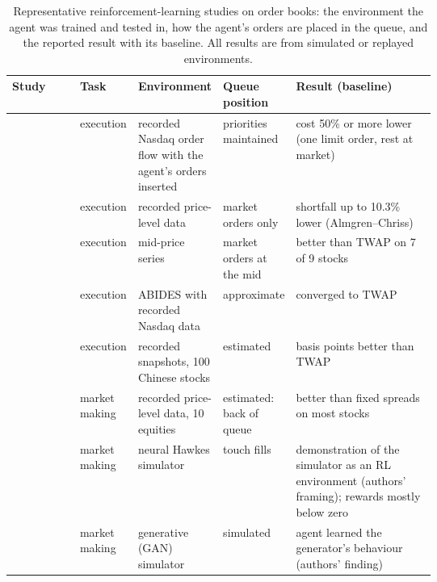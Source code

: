 \begin{table}[!htbp]
\centering\footnotesize
\caption{Representative reinforcement-learning studies on order books: the environment the agent was trained and
tested in, how the agent's orders are placed in the queue, and the reported result with its baseline. All results
are from simulated or replayed environments.}
\label{tab:rl}
\setlength{\tabcolsep}{3pt}
\begin{tabularx}{\linewidth}{>{\raggedright\arraybackslash}p{0.16\linewidth}>{\raggedright\arraybackslash}p{0.08\linewidth}>{\raggedright\arraybackslash}p{0.2\linewidth}>{\raggedright\arraybackslash}p{0.17\linewidth}>{\raggedright\arraybackslash}X}
\toprule
Study & Task & Environment & Queue position & Result (baseline) \\
\midrule
\citet{nevmyvaka2006} & execution & recorded Nasdaq order flow with the agent's orders inserted & priorities maintained & cost 50\% or more lower (one limit order, rest at market) \\
\citet{hendricks2014} & execution & recorded price-level data & market orders only & shortfall up to 10.3\% lower (Almgren--Chriss) \\
\citet{ning2021ddqn} & execution & mid-price series & market orders at the mid & better than TWAP on 7 of 9 stocks \\
\citet{karpe2020} & execution & ABIDES with recorded Nasdaq data & approximate & converged to TWAP \\
\citet{zhang2023generalizable} & execution & recorded snapshots, 100 Chinese stocks & estimated & 4.9 basis points better than TWAP \\
\citet{spooner2018} & market making & recorded price-level data, 10 equities & estimated: back of queue & better than fixed spreads on most stocks \\
\citet{lalor2025nhp} & market making & neural Hawkes simulator & touch fills & demonstration of the simulator as an RL environment (authors' framing); rewards mostly below zero \\
\citet{coletta2023cgan} & market making & generative (GAN) simulator & simulated & agent learned the generator's behaviour (authors' finding) \\
\bottomrule
\end{tabularx}
\end{table}

